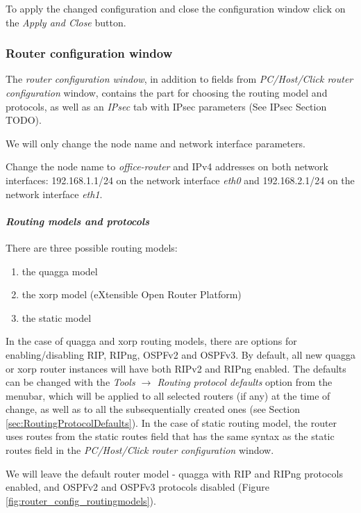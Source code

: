 To apply the changed configuration and close the configuration window click on
the \emph{Apply and Close} button.

\subsubsection{Router configuration window}
The \emph{router configuration window}, in addition to fields from
\emph{PC/Host/Click router configuration} window, contains the part for
choosing the routing model and protocols, as well as an \emph{IPsec} tab with
IPsec parameters (See IPsec Section TODO).

We will only change the node name and network interface parameters.

Change the node name to \emph{office-router} and IPv4 addresses on both network
interfaces: 192.168.1.1/24 on the network interface \emph{eth0} and
192.168.2.1/24 on the network interface \emph{eth1}.

\paragraph{\emph{Routing models and protocols}} \hfill

There are three possible routing models:
\begin{enumerate}
  \item the quagga model
  \item the xorp model (eXtensible Open Router Platform)
  \item the static model
\end{enumerate}

In the case of quagga and xorp routing models, there are options for
enabling/disabling RIP, RIPng, OSPFv2 and OSPFv3. By default, all new quagga or
xorp router instances will have both RIPv2 and RIPng enabled. The defaults can
be changed with the \emph{Tools $\to$ Routing protocol defaults} option from
the menubar, which will be applied to all selected routers (if any) at the time
of change, as well as to all the subsequentially created ones (see Section
\ref{sec:RoutingProtocolDefaults}).
In the case of static routing model, the router uses routes from the static
routes field that has the same syntax as the static routes field in the
\emph{PC/Host/Click router configuration} window.

We will leave the default router model - quagga with RIP and RIPng protocols
enabled, and OSPFv2 and OSPFv3 protocols disabled (Figure
\ref{fig:router_config_routingmodels}).

